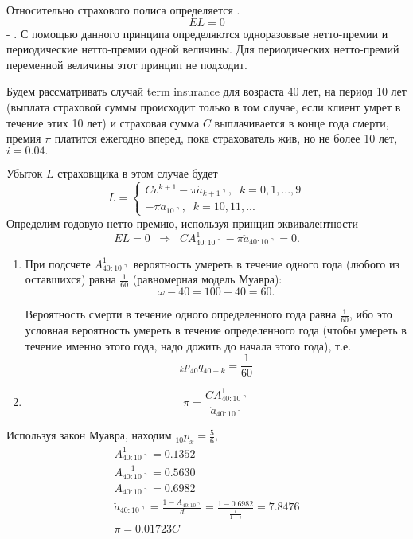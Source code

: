 Относительно страхового полиса определяется .
\[EL=0\]
- . С помощью данного принципа определяются одноразоввые нетто-премии и периодические нетто-премии одной величины. Для периодических нетто-премий переменной величины этот принцип не подходит.

\begin{example}
	Будем рассматривать случай term insurance для возраста 40 лет, на период 10 лет (выплата страховой суммы происходит только в том случае, если клиент умрет в течение этих 10 лет) и страховая сумма $ C$ выплачивается в конце года смерти, премия $ \pi$ платится ежегодно вперед, пока страхователь жив, но не более 10 лет, $ i = 0.04.$
\end{example}
\begin{solution}
	Убыток $ L$ страховщика в этом случае будет 
	\[
		L=\begin{cases}
			Cv^{k+1} - \pi \ddot{a}_{k+1\urcorner}, \;\;k=0,1,...,9\\
			-\pi \ddot{a}_{10\urcorner}, \;\; k =10,11, ...	
		\end{cases}
	\]
	Определим годовую нетто-премию, используя принцип эквивалентности
	\[ EL = 0 \;\; \Rightarrow \;\; C A_{40:10\urcorner}^{1} - \pi \ddot{a}_{40:10\urcorner} = 0.\]

	\begin{enumerate}
		\item При подсчете $ A_{40:10\urcorner}^{1}$ вероятность умереть в течение одного года (любого из оставшихся) равна $ \frac{1}{60}$ (равномерная модель Муавра):
		\[  \omega - 40 = 100 -40 = 60.\]

		Вероятность смерти в течение одного определенного года равна $ \frac{1}{60}$, ибо это условная вероятность умереть в течение определенного года (чтобы умереть в течение именно этого года, надо дожить до начала этого года), т.е.
		\[ {}_kp_{40}q_{40+k} = \frac{1}{60} \]

		\item \[\pi = \frac{C A_{40:10\urcorner}^{1}}{ \ddot{a}_{40:10\urcorner}}\]


	\end{enumerate}
	Используя закон Муавра, находим $ {}_{10}p_x = \frac{5}{6},$
	\begin{gather*}
		A_{40:10\urcorner}^{1} = 0.1352\\
		A_{40:10\urcorner}^{\;\;\;\;1} = 0.5630\\
		A_{40:10\urcorner}= 0.6982\\
		\ddot{a}_{40:10\urcorner} = \frac{1- A_{40:10\urcorner}}{d} = \frac{1-0.6982}{\frac{i}{1+i}} = 7.8476\\
		\pi = 0.01723C
	\end{gather*}
\end{solution}





